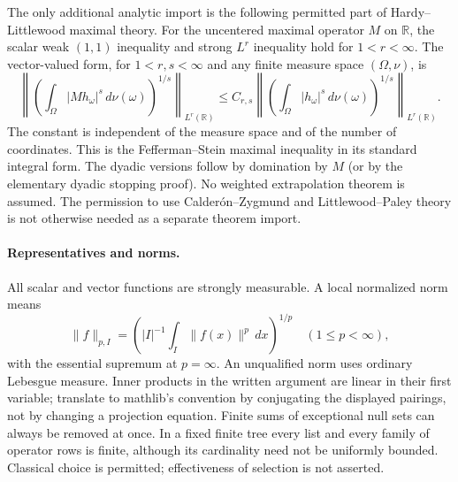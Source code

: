 \documentclass[11pt]{article}
\theoremstyle{definition}
\newcommand{\R}{\mathbb R}
\numberwithin{equation}{section}
\begin{document}
The only additional analytic import is the following permitted part of Hardy--Littlewood maximal theory. For the uncentered maximal operator $M$ on $\R$, the scalar weak $(1,1)$ inequality and strong $L^r$ inequality hold for $1<r<\infty$. The vector-valued form, for $1<r,s<\infty$ and any finite measure space $(\Omega,\nu)$, is
\[
 \left\|\left(\int_\Omega |Mh_\omega|^s\,d\nu(\omega)\right)^{1/s}\right\|_{L^r(\R)}
 \le C_{r,s}\left\|\left(\int_\Omega |h_\omega|^s\,d\nu(\omega)\right)^{1/s}\right\|_{L^r(\R)}.
\]
The constant is independent of the measure space and of the number of coordinates. This is the Fefferman--Stein maximal inequality in its standard integral form. The dyadic versions follow by domination by $M$ (or by the elementary dyadic stopping proof). No weighted extrapolation theorem is assumed. The permission to use Calder\'on--Zygmund and Littlewood--Paley theory is not otherwise needed as a separate theorem import.

\paragraph{Representatives and norms.}
All scalar and vector functions are strongly measurable. A local normalized norm means
\[
 \|f\|_{p,I}=\left(|I|^{-1}\int_I\|f(x)\|^p\,dx\right)^{1/p}
 \quad(1\le p<\infty),
\]
with the essential supremum at $p=\infty$. An unqualified norm uses ordinary Lebesgue measure. Inner products in the written argument are linear in their first variable; translate to mathlib's convention by conjugating the displayed pairings, not by changing a projection equation. Finite sums of exceptional null sets can always be removed at once. In a fixed finite tree every list and every family of operator rows is finite, although its cardinality need not be uniformly bounded. Classical choice is permitted; effectiveness of selection is not asserted.
\end{document}
